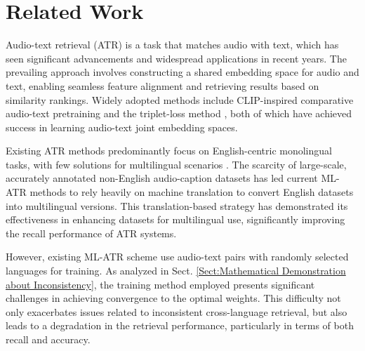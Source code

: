 \section{Related Work}
Audio-text retrieval (ATR) \cite{lou2022audio,xie2024gpa,xin2024diffatr} is a task that matches audio with text, which has seen significant advancements and widespread applications in recent years. The prevailing approach involves constructing a shared embedding space for audio and text, enabling seamless feature alignment and retrieving results based on similarity rankings. Widely adopted methods include CLIP-inspired \cite{yu2022coca,li2022blip} comparative audio-text pretraining \cite{elizalde2023clap,wu2022wav2clip,guzhov2022audioclip} and the triplet-loss method \cite{mei2022metric}, both of which have achieved success in learning audio-text joint embedding spaces.

Existing ATR methods predominantly focus on English-centric monolingual tasks, with few solutions for multilingual scenarios \cite{yan2024bridging}. The scarcity of large-scale, accurately annotated non-English audio-caption datasets has led current ML-ATR methods to rely heavily on machine translation \cite{tiedemann2020opus,nllb2022no} to convert English datasets into multilingual versions. This translation-based strategy \cite{cousin2023multilingual,yan2024bridging} has demonstrated its effectiveness in enhancing datasets for multilingual use, significantly improving the recall performance of ATR systems. 

However, existing ML-ATR scheme \cite{yan2024bridging} use audio-text pairs with randomly selected languages for training. As analyzed in Sect. \ref{Sect:Mathematical Demonstration about Inconsistency}, the training method employed presents significant challenges in achieving convergence to the optimal weights. This difficulty not only exacerbates issues related to inconsistent cross-language retrieval, but also leads to a degradation in the retrieval performance, particularly in terms of both recall and accuracy.